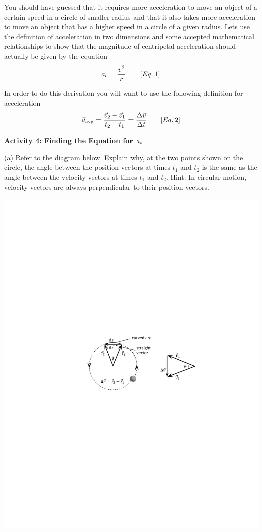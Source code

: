 You should have guessed that it requires more acceleration to move an object
of a certain speed in a circle of smaller radius and that it also takes more
acceleration to move an object that has a higher speed in a circle of a given
radius. Lets use the definition of acceleration in two dimensions and some accepted
mathematical relationships to show that the magnitude of centripetal acceleration
should actually be given by the equation
\[
a_{\rm c}=\frac{v^{2}}{r}\qquad [Eq.\: 1]\]


In order to do this derivation you will want to use the following definition
for acceleration
\[
\vec a_{\rm avg} =\frac{{{\vec v}_{2}}-{{\vec v}_{1}}}{t_{2}-t_{1}}=\frac{\Delta {\vec v}}{\Delta t}\qquad [Eq.\: 2]\]


\textbf{Activity 4: Finding the Equation for \(a _{\rm c} \) }

(a) Refer to the diagram below. Explain why, at the two points shown on the
circle, the angle between the position vectors at times \( t_{1} \) and \( t_{2} \)
is the same as the angle between the velocity vectors at times \( t_{1} \)
and \( t_{2} \). Hint: In circular motion, velocity vectors are always perpendicular
to their position vectors.

\vspace{0.3cm}
{\par\raggedright \includegraphics{circ_motion/circ_motion_fig3_new.pdf} \par}
\vspace{0.3cm}

